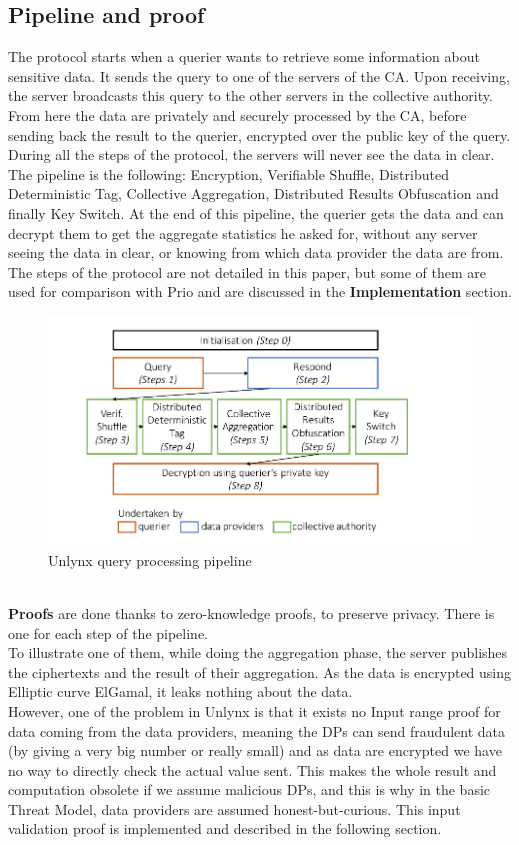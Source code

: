 \documentclass{article}
\begin{document}
\subsection{Pipeline and proof}
The protocol starts when a querier wants to retrieve some information about sensitive data. It sends the query to one of the servers of the CA. Upon receiving, the server broadcasts this query to the other servers in the collective authority.\\
From here the data are privately and securely processed by the CA, before sending back the result to the querier, encrypted over the public key of the query. During all the steps of the protocol, the servers will never see the data in clear.\\
The pipeline is the following: Encryption, Verifiable Shuffle, Distributed Deterministic Tag, Collective Aggregation, Distributed Results Obfuscation and finally Key Switch. At the end of this pipeline, the querier gets the data and can decrypt them to get the aggregate statistics he asked for, without any server seeing the data in clear, or knowing from which data provider the data are from.\\
The steps of the protocol are not detailed in this paper, but some of them are used for comparison with Prio and are discussed in the \textbf{Implementation} section.
\begin{figure}[h]
\centering
\includegraphics[scale=0.5]{img/unlynxPip.png}
\caption{Unlynx query processing pipeline}
\end{figure}
\\
\textbf{Proofs} are done thanks to zero-knowledge proofs, to preserve privacy. There is one for each step of the pipeline.\\
To illustrate one of them, while doing the aggregation phase, the server publishes the ciphertexts and the result of their aggregation. As the data is encrypted using Elliptic curve ElGamal, it leaks nothing about the data.\\
However, one of the problem in Unlynx is that it exists no Input range proof for data coming from the data providers, meaning the DPs can send fraudulent data (by giving a very big number or really small) and as data are encrypted we have no way to directly check the actual value sent. This makes the whole result and computation obsolete if we assume malicious DPs, and this is why in the basic Threat Model, data providers are assumed honest-but-curious. This input validation proof is implemented and described in the following section.\\
\end{document}
